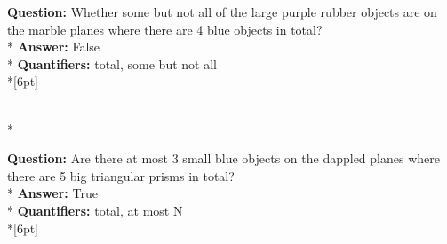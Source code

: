 \begin{figure*}
\begin{minipage}{0.48\textwidth}
    \begin{minipage}[t][2.2cm][t]{1\textwidth}
      \footnotesize
      \textbf{Question:} Whether some but not all of the large purple rubber objects are on the marble planes where there are 4 blue objects in total? \\*
      \textbf{Answer:} False \\*
      \textbf{Quantifiers:} total, some but not all  \\*[6pt]
    \end{minipage}\\*
    \begin{minipage}[t][2.2cm][t]{1\textwidth}
      \footnotesize
      \textbf{Question:} Are there at most 3 small blue objects on the dappled planes where there are 5 big triangular prisms in total? \\*
      \textbf{Answer:} True \\*
      \textbf{Quantifiers:} total, at most N \\*[6pt]
    \end{minipage}
  \end{minipage}
  \vspace{0.2cm}
  

\end{figure*}
